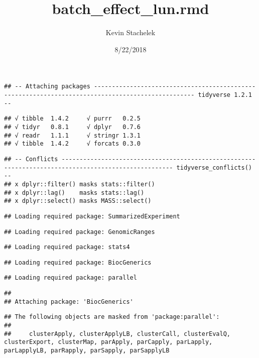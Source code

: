 \documentclass[]{article}
\title{batch\_effect\_lun.rmd}
\author{Kevin Stachelek}
\date{8/22/2018}
\begin{document}
\maketitle

\begin{verbatim}
## -- Attaching packages -------------------------------------------------------------------------------------------------- tidyverse 1.2.1 --
\end{verbatim}

\begin{verbatim}
## √ tibble  1.4.2     √ purrr   0.2.5
## √ tidyr   0.8.1     √ dplyr   0.7.6
## √ readr   1.1.1     √ stringr 1.3.1
## √ tibble  1.4.2     √ forcats 0.3.0
\end{verbatim}

\begin{verbatim}
## -- Conflicts ----------------------------------------------------------------------------------------------------- tidyverse_conflicts() --
## x dplyr::filter() masks stats::filter()
## x dplyr::lag()    masks stats::lag()
## x dplyr::select() masks MASS::select()
\end{verbatim}

\begin{verbatim}
## Loading required package: SummarizedExperiment
\end{verbatim}

\begin{verbatim}
## Loading required package: GenomicRanges
\end{verbatim}

\begin{verbatim}
## Loading required package: stats4
\end{verbatim}

\begin{verbatim}
## Loading required package: BiocGenerics
\end{verbatim}

\begin{verbatim}
## Loading required package: parallel
\end{verbatim}

\begin{verbatim}
## 
## Attaching package: 'BiocGenerics'
\end{verbatim}

\begin{verbatim}
## The following objects are masked from 'package:parallel':
## 
##     clusterApply, clusterApplyLB, clusterCall, clusterEvalQ, clusterExport, clusterMap, parApply, parCapply, parLapply, parLapplyLB, parRapply, parSapply, parSapplyLB
\end{verbatim}
\end{document}
